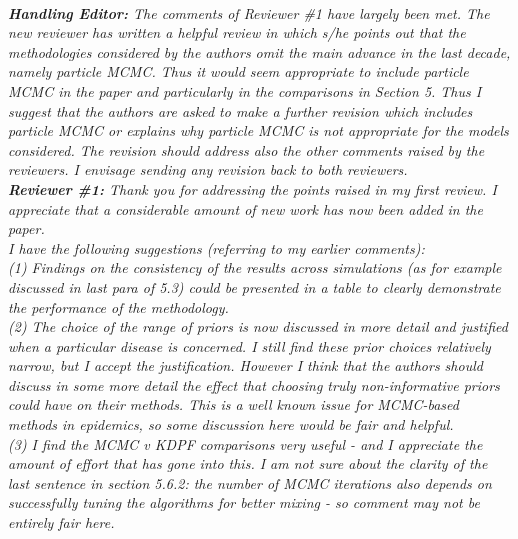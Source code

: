 \documentclass{article}
\begin{document}
 \\

\noindent \emph{{\bf Handling Editor:} The comments of Reviewer \#1 have largely been met.  The new reviewer has written a helpful review in which s/he points out that the methodologies considered by the authors omit the main advance in the last decade, namely particle MCMC.  Thus it would seem appropriate to include particle MCMC in the paper and particularly in the comparisons in Section 5.  Thus I suggest that the authors are asked to make a further revision which includes particle MCMC or explains why particle MCMC is not appropriate for the models considered.  The revision should address also the other comments raised by the reviewers.  I envisage sending any revision back to both reviewers.} \\

\noindent \emph{{\bf Reviewer \#1:} Thank you for addressing the points raised in my first review. I appreciate that a considerable amount of new work has now been added in the paper.} \\

\noindent \emph{I have the following suggestions (referring to my earlier comments):} \\

\noindent \emph{(1) Findings on the consistency of the results across simulations (as for example discussed in last para of 5.3) could be presented in a table to clearly demonstrate the performance of the methodology.} \\

\noindent \emph{(2) The choice of the range of priors is now discussed in more detail and justified when a particular disease is concerned. I still find these prior choices relatively narrow, but I accept the justification. However I think that the authors should discuss in some more detail the effect that choosing truly non-informative priors could have on their methods. This is a well known issue for MCMC-based methods in epidemics, so some discussion here would be fair and helpful.} \\

\noindent \emph{(3) I find the MCMC v KDPF comparisons very useful - and I appreciate the amount of effort that has gone into this. I am not sure about the clarity of the last sentence in section 5.6.2: the number of MCMC iterations also depends on successfully tuning the algorithms for better mixing - so comment may not be entirely fair here.} \\
\end{document}
